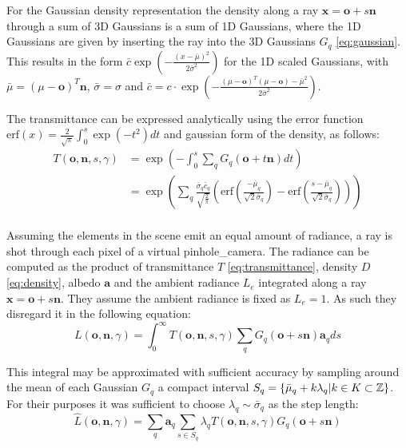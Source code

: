 \documentclass[a4paper, 11pt]{memoir}
\newcommand*{\erf}{\text{erf}}
\begin{document}
    For the Gaussian density representation the density along a ray $\mathbf{x} = \mathbf{o} + s\mathbf{n}$ through a
    sum of 3D Gaussians is a sum of 1D Gaussians, where the 1D Gaussians are given by inserting the ray into the
    3D Gaussians $G_q$ \eqref{eq:gaussian}. This results in the form
    $\bar{c} \exp{\left( - \frac{(x - \bar{\mu})^2}{2\bar{\sigma}^2} \right)}$ for the 1D scaled Gaussians, with
    $\bar{\mu} = (\mu - \mathbf{o})^T\mathbf{n}$, $\bar{\sigma} = \sigma$ and
    $\bar{c} = c \cdot \exp{\left( - \frac{(\mu - \mathbf{o})^T(\mu - \mathbf{o}) - \bar{\mu}^2}{2\bar{\sigma}^2} \right)}$.

    The \gls{transmittance} can be expressed analytically using the error function
    $\erf{(x)} = \frac{2}{\sqrt{\pi}}\int_0^s \exp{(-t^2)} dt$ and gaussian form of the density, as follows:
    \begin{equation}
        \begin{aligned}
            T(\mathbf{o}, \mathbf{n}, s, \gamma) &= \exp{\left( -\int_0^s
                \sum_q G_q(\mathbf{o} + t\mathbf{n} ) dt \right)}\\
            &= \exp{\left( \sum_q \frac{\bar{\sigma}_q \bar{c}_q}{\sqrt{\frac{2}{\pi}}}
            \left( \erf{\left( \frac{-\bar{\mu}_q}{\sqrt{2}\bar{\sigma}_q} \right)}
            - \erf{\left( \frac{s - \bar{\mu}_q}{\sqrt{2}\bar{\sigma}_q} \right)} \right) \right)}\\
        \end{aligned}
        \label{eq:transmittance_analytical}
    \end{equation}

    Assuming the elements in the scene emit an equal amount of \gls{radiance}, a ray is shot through each pixel of a virtual
    \gls{pinhole_camera}. The \gls{radiance} can be computed as the product of \gls{transmittance} $T$ \eqref{eq:transmittance},
    density $D$ \eqref{eq:density}, \gls{albedo} $\mathbf{a}$ and the ambient \gls{radiance} $L_e$ integrated along a ray
    $\mathbf{x} = \mathbf{o} + s\mathbf{n}$. They assume the ambient \gls{radiance} is fixed as $L_e = 1$. As such they
    disregard it in the following equation:
    \begin{equation}
        L(\mathbf{o}, \mathbf{n}, \gamma) = \int_0^\infty T(\mathbf{o}, \mathbf{n}, s, \gamma)
            \sum_q G_q(\mathbf{o} + s\mathbf{n})\mathbf{a}_q ds
    \end{equation}
    
    This integral may be approximated with sufficient accuracy by sampling around the mean of each Gaussian $G_q$
    a compact interval $S_q = \{ \bar{\mu}_q + k\lambda_q | k \in K \subset \mathbb{Z} \}$. For their purposes it was sufficient
    to choose $\lambda_q \sim \bar{\sigma}_q$ as the step length:
    \begin{equation}
        \hat{L}(\mathbf{o}, \mathbf{n}, \gamma) = \sum_q \mathbf{a}_q \sum_{s \in S_q}
            \lambda_q T(\mathbf{o}, \mathbf{n}, s, \gamma)G_q(\mathbf{o} + s\mathbf{n})
        \label{eq:radiance}
    \end{equation}
\end{document}
